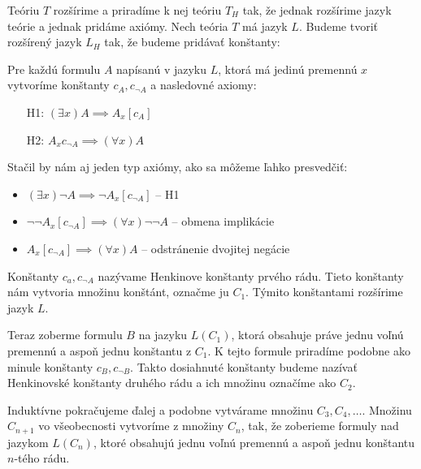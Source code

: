 \begin{dokaz}
    Teóriu $T$ rozšírime a priradíme k nej teóriu $T_H$ tak, že
    jednak rozšírime jazyk teórie a jednak pridáme axiómy.
    Nech teória $T$ má jazyk $L$.
    Budeme tvoriť rozšírený jazyk $L_H$ tak, že budeme pridávať konštanty:

    Pre každú formulu $A$ napísanú v jazyku $L$,
    ktorá má jedinú premennú $x$ vytvoríme konštanty $c_A, c_{\neg A}$
    a nasledovné axiomy: 
    \begin{itemize}
        \item[H1:]  $(\exists x) A \implies A_x[c_A]$
        \item[H2:]  $A_x{c_{\neg A}} \implies (\forall x) A$
    \end{itemize}

    Stačil by nám aj jeden typ axiómy, ako sa môžeme ľahko presvedčiť:
    \begin{itemize}
        \item $(\exists x) \neg A \implies \neg A_x[c_{\neg A}]$ -- H1
        \item $\neg \neg A_x[c_{\neg A}] \implies
                (\forall x) \neg \neg A$ -- obmena implikácie
        \item $A_x[c_{\neg A}] \implies (\forall x) A$ -- odstránenie
            dvojitej negácie
    \end{itemize}

    Konštanty $c_a, c_{\neg A}$ nazývame Henkinove konštanty prvého
    rádu. Tieto konštanty nám vytvoria množinu konštánt, označme ju
    $C_1$. Týmito konštantami rozšírime jazyk $L$.
    
    Teraz zoberme formulu $B$ na jazyku $L(C_1)$, ktorá obsahuje práve
    jednu voľnú premennú a aspoň jednu konštantu z $C_1$. K tejto
    formule priradíme podobne ako minule konštanty $c_B, c_{\neg B}$.
    Takto dosiahnuté konštanty budeme nazívať Henkinovské konštanty
    druhého rádu a ich množinu označíme ako $C_2$.
    
    Induktívne pokračujeme ďalej a podobne vytvárame množinu $C_3,
    C_4, \dots$.
    Množinu $C_{n+1}$ vo všeobecnosti vytvoríme z množiny $C_n$, tak,
    že zoberieme formuly nad jazykom $L(C_n)$, ktoré obsahujú jednu
    voľnú premennú a aspoň jednu konštantu $n$-tého rádu.


\end{dokaz}
